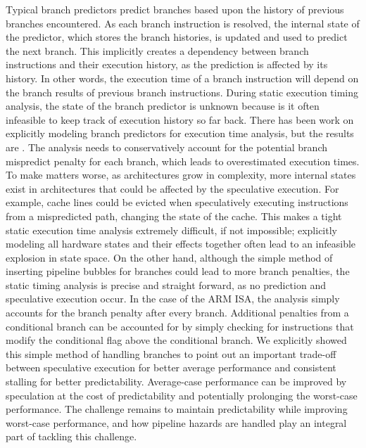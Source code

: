 Typical branch predictors predict branches based upon the history of previous branches encountered.  
As each branch instruction is resolved, the internal state of the predictor, which stores the branch histories, is updated and used to predict the next branch.
This implicitly creates a dependency between branch instructions and their execution history, as the prediction is affected by its history.
In other words, the execution time of a branch instruction will depend on the branch results of previous branch instructions.
During static execution timing analysis, the state of the branch predictor is unknown because is it often infeasible to keep track of execution history so far back.   
There has been work on explicitly modeling branch predictors for execution time analysis, but the results are .
The analysis needs to conservatively account for the potential branch mispredict penalty for each branch, which leads to overestimated execution times.
To make matters worse, as architectures grow in complexity, more internal states exist in architectures that could be affected by the speculative execution. 
For example, cache lines could be evicted when speculatively executing instructions from a mispredicted path, changing the state of the cache.  
This makes a tight static execution time analysis extremely difficult, if not impossible; explicitly modeling all hardware states and their effects together often lead to an infeasible explosion in state space. 
On the other hand, although the simple method of inserting pipeline bubbles for branches could lead to more branch penalties, the static timing analysis is precise and straight forward, as no prediction and speculative execution occur. 
In the case of the ARM ISA, the analysis simply accounts for the branch penalty after every branch. 
Additional penalties from a conditional branch can be accounted for by simply checking for instructions that modify the conditional flag above the conditional branch.
We explicitly showed this simple method of handling branches to point out an important trade-off between speculative execution for better average performance and consistent stalling for better predictability.
Average-case performance can be improved by speculation at the cost of predictability and potentially prolonging the worst-case performance.  
The challenge remains to maintain predictability while improving worst-case performance, and how pipeline hazards are handled play an integral part of tackling this challenge.           

